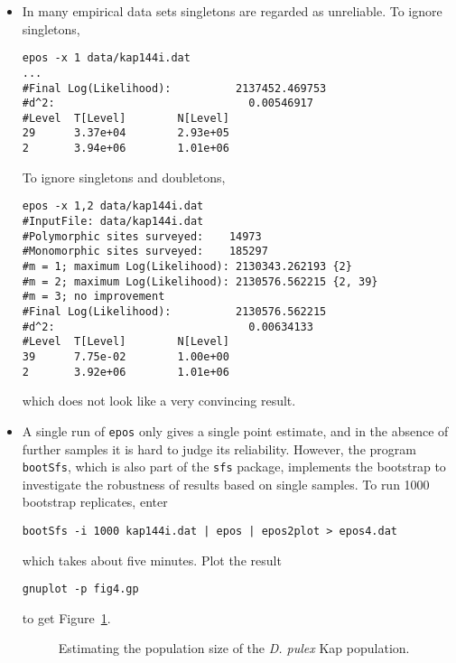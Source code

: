\documentclass[a4paper, english]{article}
\newcommand{\ty}{\texttt}
\begin{document}
\begin{itemize}
\begin{verbatim}
#Level  T[Level]        N[Level]
26      4.97e+04        3.76e+05
24      8.78e+04        2.74e+06
6       4.40e+05        5.63e+05
4       2.64e+06        4.12e+06
2       3.05e+06        1.55e+05
\end{verbatim}
which is very similar to the result with the log-likelihood threshold.
\item In many empirical data sets singletons are regarded as
  unreliable. To ignore singletons,
\begin{verbatim}
epos -x 1 data/kap144i.dat 
...
#Final Log(Likelihood):          2137452.469753
#d^2:                              0.00546917
#Level  T[Level]        N[Level]
29      3.37e+04        2.93e+05
2       3.94e+06        1.01e+06
\end{verbatim}
To ignore singletons and doubletons,
\begin{verbatim}
epos -x 1,2 data/kap144i.dat 
#InputFile:	data/kap144i.dat
#Polymorphic sites surveyed:	14973
#Monomorphic sites surveyed:	185297
#m = 1; maximum Log(Likelihood): 2130343.262193	{2}
#m = 2; maximum Log(Likelihood): 2130576.562215	{2, 39}
#m = 3; no improvement
#Final Log(Likelihood):          2130576.562215
#d^2:                              0.00634133
#Level  T[Level]        N[Level]
39      7.75e-02        1.00e+00
2       3.92e+06        1.01e+06
\end{verbatim}
which does not look like a very convincing result.
\item A single run of \ty{epos} only gives a single point estimate,
  and in the absence of further samples it is hard to judge its
  reliability. However, the program \ty{bootSfs}, which is also part
  of the \ty{sfs} package, implements the bootstrap to investigate the
  robustness of results based on single samples. To run 1000 bootstrap
  replicates, enter
\begin{verbatim}
bootSfs -i 1000 kap144i.dat | epos | epos2plot > epos4.dat
\end{verbatim}
which takes about five minutes. Plot the result
\begin{verbatim}
gnuplot -p fig4.gp
\end{verbatim}
to get Figure~\ref{fig:kap}.
\begin{figure}
  \begin{center}
    \scalebox{0.6}{}
  \end{center}
  \caption{Estimating the population size of the \textit{D. pulex} Kap
    population.}\label{fig:kap}
\end{figure}
\end{itemize}
\end{document}
